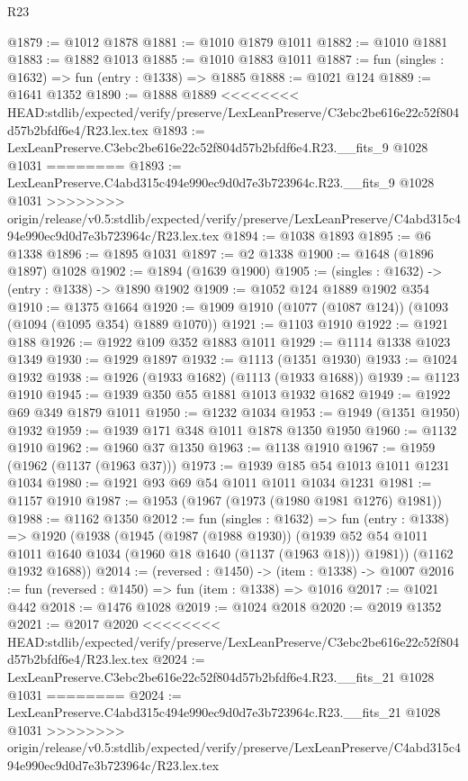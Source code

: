 \begin{lexlean}{R23}
\begin{coremodule}
{{{{{{{{{{{{{{{{{{{{{{{{{{{{{{{{{{{{{{{{{{{{{{{@1879 := @1012 @1878
@1881 := @1010 @1879 @1011
@1882 := @1010 @1881
@1883 := @1882 @1013
@1885 := @1010 @1883 @1011
@1887 := fun (singles : @1632) => fun (entry : @1338) => @1885
@1888 := @1021 @124
@1889 := @1641 @1352
@1890 := @1888 @1889
<<<<<<<< HEAD:stdlib/expected/verify/preserve/LexLeanPreserve/C3ebc2be616e22c52f804d57b2bfdf6e4/R23.lex.tex
@1893 := LexLeanPreserve.C3ebc2be616e22c52f804d57b2bfdf6e4.R23.__fits_9 @1028 @1031
========
@1893 := LexLeanPreserve.C4abd315c494e990ec9d0d7e3b723964c.R23.__fits_9 @1028 @1031
>>>>>>>> origin/release/v0.5:stdlib/expected/verify/preserve/LexLeanPreserve/C4abd315c494e990ec9d0d7e3b723964c/R23.lex.tex
@1894 := @1038 @1893
@1895 := @6 @1338
@1896 := @1895 @1031
@1897 := @2 @1338
@1900 := @1648 (@1896 @1897) @1028
@1902 := @1894 (@1639 @1900)
@1905 := (singles : @1632) -> (entry : @1338) -> @1890 @1902
@1909 := @1052 @124 @1889 @1902 @354
@1910 := @1375 @1664
@1920 := @1909 @1910 (@1077 (@1087 @124)) (@1093 (@1094 (@1095 @354) @1889 @1070))
@1921 := @1103 @1910
@1922 := @1921 @188
@1926 := @1922 @109 @352 @1883 @1011
@1929 := @1114 @1338 @1023 @1349
@1930 := @1929 @1897
@1932 := @1113 (@1351 @1930)
@1933 := @1024 @1932
@1938 := @1926 (@1933 @1682) (@1113 (@1933 @1688))
@1939 := @1123 @1910
@1945 := @1939 @350 @55 @1881 @1013 @1932 @1682
@1949 := @1922 @69 @349 @1879 @1011
@1950 := @1232 @1034
@1953 := @1949 (@1351 @1950) @1932
@1959 := @1939 @171 @348 @1011 @1878 @1350 @1950
@1960 := @1132 @1910
@1962 := @1960 @37 @1350
@1963 := @1138 @1910
@1967 := @1959 (@1962 (@1137 (@1963 @37)))
@1973 := @1939 @185 @54 @1013 @1011 @1231 @1034
@1980 := @1921 @93 @69 @54 @1011 @1011 @1034 @1231
@1981 := @1157 @1910
@1987 := @1953 (@1967 (@1973 (@1980 @1981 @1276) @1981))
@1988 := @1162 @1350
@2012 := fun (singles : @1632) =>
  fun (entry : @1338) =>
  @1920
    (@1938
      (@1945
        (@1987 (@1988 @1930))
        (@1939 @52 @54 @1011 @1011 @1640 @1034 (@1960 @18 @1640 (@1137 (@1963 @18))) @1981))
      (@1162 @1932 @1688))
@2014 := (reversed : @1450) -> (item : @1338) -> @1007
@2016 := fun (reversed : @1450) => fun (item : @1338) => @1016
@2017 := @1021 @442
@2018 := @1476 @1028
@2019 := @1024 @2018
@2020 := @2019 @1352
@2021 := @2017 @2020
<<<<<<<< HEAD:stdlib/expected/verify/preserve/LexLeanPreserve/C3ebc2be616e22c52f804d57b2bfdf6e4/R23.lex.tex
@2024 := LexLeanPreserve.C3ebc2be616e22c52f804d57b2bfdf6e4.R23.__fits_21 @1028 @1031
========
@2024 := LexLeanPreserve.C4abd315c494e990ec9d0d7e3b723964c.R23.__fits_21 @1028 @1031
>>>>>>>> origin/release/v0.5:stdlib/expected/verify/preserve/LexLeanPreserve/C4abd315c494e990ec9d0d7e3b723964c/R23.lex.tex
}}}}}}}}}}}}}}}}}}}}}}}}}}}}}}}}}}}}}}}}}}}}}}}
\end{coremodule}
\end{lexlean}
